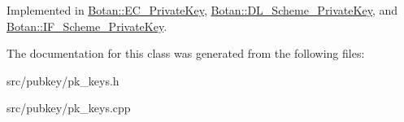 Implemented in \hyperlink{classBotan_1_1EC__PrivateKey_a33b5aea3c19944e5f48554fb8cce3e59}{Botan\-::\-E\-C\-\_\-\-Private\-Key}, \hyperlink{classBotan_1_1DL__Scheme__PrivateKey_aebc1e9c10721bf4e86b368c631161707}{Botan\-::\-D\-L\-\_\-\-Scheme\-\_\-\-Private\-Key}, and \hyperlink{classBotan_1_1IF__Scheme__PrivateKey_a165fdaed320976e020c1c0fe241e02f9}{Botan\-::\-I\-F\-\_\-\-Scheme\-\_\-\-Private\-Key}.



The documentation for this class was generated from the following files\-:\begin{DoxyCompactItemize}
\item 
src/pubkey/pk\-\_\-keys.\-h\item 
src/pubkey/pk\-\_\-keys.\-cpp\end{DoxyCompactItemize}

